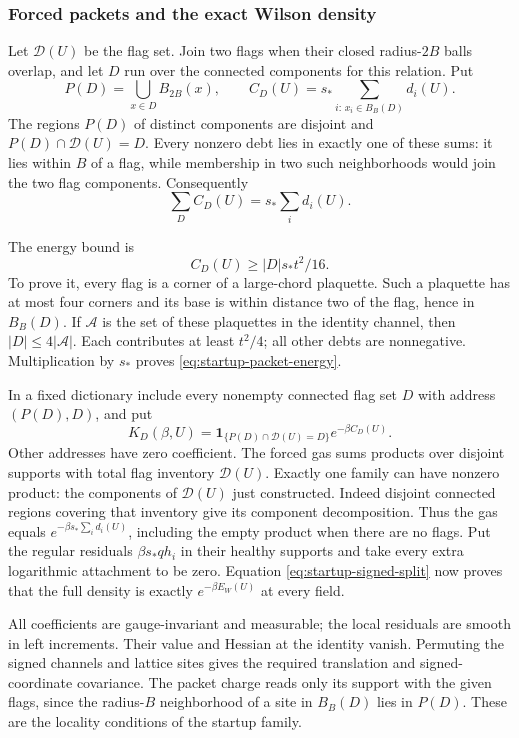 \subsubsection{Forced packets and the exact Wilson density}
Let $\mathcal D(U)$ be the flag set. Join two flags when their closed
radius-$2B$ balls overlap, and let $D$ run over the connected
components for this relation. Put
\[
 P(D)=\bigcup_{x\in D}B_{2B}(x),\qquad
 C_D(U)=s_*\sum_{i:\,x_i\in B_B(D)}d_i(U).
\]
The regions $P(D)$ of distinct components are disjoint and
$P(D)\cap\mathcal D(U)=D$. Every nonzero debt lies in exactly one
of these sums: it lies within $B$ of a flag, while membership in
two such neighborhoods would join the two flag components.
Consequently
\[
                 \sum_D C_D(U)=s_*\sum_i d_i(U).
\]

The energy bound is
\begin{equation}\label{eq:startup-packet-energy}
                    C_D(U)\ge |D|s_*t^2/16.
\end{equation}
To prove it, every flag is a corner of a large-chord plaquette.
Such a plaquette has at most four corners and its base is within
distance two of the flag, hence in $B_B(D)$. If $\mathcal A$ is
the set of these plaquettes in the identity channel, then
$|D|\le4|\mathcal A|$. Each contributes at least $t^2/4$;
all other debts are nonnegative. Multiplication by $s_*$ proves
\eqref{eq:startup-packet-energy}.

In a fixed dictionary include every nonempty connected flag set $D$
with address $(P(D),D)$, and put
\[
 K_D(\beta,U)=
 \mathbf1_{\{P(D)\cap\mathcal D(U)=D\}}e^{-\beta C_D(U)}.
\]
Other addresses have zero coefficient. The forced gas sums products
over disjoint supports with total flag inventory $\mathcal D(U)$.
Exactly one family can have nonzero product: the components of
$\mathcal D(U)$ just constructed. Indeed disjoint connected regions
covering that inventory give its component decomposition. Thus the
gas equals $e^{-\beta s_*\sum_i d_i(U)}$, including the empty
product when there are no flags. Put the regular residuals
$\beta s_*q h_i$ in their healthy supports and take every extra
logarithmic attachment to be zero. Equation
\eqref{eq:startup-signed-split} now proves that the full density is
exactly $e^{-\beta E_W(U)}$ at every field.

All coefficients are gauge-invariant and measurable; the local
residuals are smooth in left increments. Their value and Hessian
at the identity vanish. Permuting the signed channels and lattice
sites gives the required translation and signed-coordinate
covariance. The packet charge reads only its support with the given
flags, since the radius-$B$ neighborhood of a site in $B_B(D)$
lies in $P(D)$. These are the locality conditions of the startup
family.

